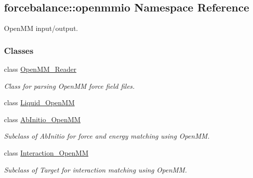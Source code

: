 \hypertarget{namespaceforcebalance_1_1openmmio}{\subsection{forcebalance\-:\-:openmmio \-Namespace \-Reference}
\label{namespaceforcebalance_1_1openmmio}
}


\-Open\-M\-M input/output.  


\subsubsection*{\-Classes}
\begin{DoxyCompactItemize}
\item 
class \hyperlink{classforcebalance_1_1openmmio_1_1OpenMM__Reader}{\-Open\-M\-M\-\_\-\-Reader}
\begin{DoxyCompactList}\small\item\em \-Class for parsing \-Open\-M\-M force field files. \end{DoxyCompactList}\item 
class \hyperlink{classforcebalance_1_1openmmio_1_1Liquid__OpenMM}{\-Liquid\-\_\-\-Open\-M\-M}
\item 
class \hyperlink{classforcebalance_1_1openmmio_1_1AbInitio__OpenMM}{\-Ab\-Initio\-\_\-\-Open\-M\-M}
\begin{DoxyCompactList}\small\item\em \-Subclass of \-Ab\-Initio for force and energy matching using \-Open\-M\-M. \end{DoxyCompactList}\item 
class \hyperlink{classforcebalance_1_1openmmio_1_1Interaction__OpenMM}{\-Interaction\-\_\-\-Open\-M\-M}
\begin{DoxyCompactList}\small\item\em \-Subclass of \-Target for interaction matching using \-Open\-M\-M. \end{DoxyCompactList}\end{DoxyCompactItemize}
